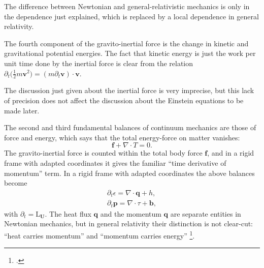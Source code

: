\documentclass[\ifafour a4paper,12pt,\else a5paper,10pt,\fi%
onecolumn,oneside,article,%
british%
]{memoir}
\theoremstyle{remark}
\theoremstyle{innote}
\newcommand*{\citep}{\footcites}
\newcommand*{\de}{\partialup}%
\newcommand*{\di}{\mathrm{d}}%
\renewcommand*{\|}[1][]{\nonscript\,#1\vert\nonscript\;\mathopen{}}
\newcommand*{\Li}{\mathrm{L}}
\newcommand*{\yjj}{J}
\newcommand*{\yj}{\bm{\yjj}}
\newcommand*{\yQ}{h}
\newcommand*{\yqq}{q}
\newcommand*{\yq}{\bm{\yqq}}
\newcommand*{\yTT}{\tau}
\newcommand*{\yT}{\bm{\yTT}}
\newcommand*{\yTTf}{T}
\newcommand*{\ybb}{f}
\newcommand*{\yb}{\bm{\ybb}}
\newcommand*{\ybbf}{b}
\newcommand*{\ybf}{\bm{\ybbf}}
\newcommand*{\yvvt}{v}
\newcommand*{\yvt}{\bm{\yvvt}}
\newcommand*{\yFF}{U}
\newcommand*{\yF}{\bm{\yFF}}
\newcommand*{\yff}{f}
\newcommand*{\yf}{\bm{\yff}}
\newcommand*{\ypp}{p}
\newcommand*{\yp}{\bm{\ypp}}
\newcommand*{\yeen}{e}
\renewcommand*{\yen}{\bm{\yeen}}
\newcommand*{\ye}{\epsilon}
\newcommand*{\ynab}{\nabla}
\begin{document}
The difference between Newtonian and general-relativistic mechanics is only
in the dependence just explained, which is replaced by a local dependence in
general relativity.

The fourth component of the gravito-inertial force is the change in kinetic
and gravitational potential energies. The fact that kinetic energy is just
the work per unit time done by the inertial force is clear from the
relation $\de_t\bigl(\frac{1}{2}m\yvt^2\bigr) = (m\de_t\yvt) \cdot \yvt$.

The discussion just given about the inertial force is very imprecise, but
this lack of precision does not affect the discussion about the Einstein
equations to be made later.

\bigskip

The second and third fundamental balances of continuum mechanics are those
of force and energy, which says that the total energy-force on matter vanishes:
\begin{equation}
  \label{eq:force_balance}
  \yb + \ynab\cdot\yTTf = 0.
\end{equation}
The gravito-inertial force is counted within the total body force $\yb$,
and in a rigid frame with adapted coordinates it gives the familiar
\enquote{time derivative of momentum} term. In a rigid frame with adapted
coordinates the above balances become
\begin{gather}
  \label{eq:energy_balance_newtonian}
  \de_t \ye = \ynab\cdot\yq + \yQ,
  \\
  \de_t\yp = \ynab\cdot\yTT + \ybf,
\end{gather}
with $\de_t = \Li_{\yF}$. The heat flux $\yq$ and the momentum $\yq$ are
separate entities in Newtonian mechanics, but in general relativity their
distinction is not clear-cut: \enquote{heat carries momentum} and
\enquote{momentum carries energy} \citep{eckart1940c}.




\end{document}
